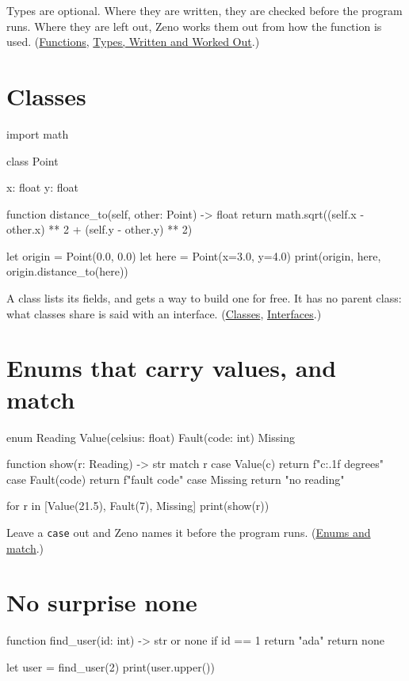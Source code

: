 Types are optional. Where they are written, they are checked before
the program runs. Where they are left out, Zeno works them out from
how the function is used. (\hyperref[ch-functions]{Functions},
\hyperref[ch-types]{Types, Written and Worked Out}.)

\section{Classes}

\begin{zeno}
import math

class Point {
    x: float
    y: float

    function distance_to(self, other: Point) -> float {
        return math.sqrt((self.x - other.x) ** 2 + (self.y - other.y) ** 2)
    }
}

let origin = Point(0.0, 0.0)
let here = Point(x=3.0, y=4.0)
print(origin, here, origin.distance_to(here))
\end{zeno}

A class lists its fields, and gets a way to build one for free. It has
no parent class: what classes share is said with an interface.
(\hyperref[ch-classes]{Classes}, \hyperref[ch-interfaces]{Interfaces}.)

\section{Enums that carry values, and match}

\begin{zeno}
enum Reading {
    Value(celsius: float)
    Fault(code: int)
    Missing
}

function show(r: Reading) -> str {
    match r {
        case Value(c) { return f"{c:.1f} degrees" }
        case Fault(code) { return f"fault {code}" }
        case Missing { return "no reading" }
    }
}

for r in [Value(21.5), Fault(7), Missing] {
    print(show(r))
}
\end{zeno}

Leave a \verb|case| out and Zeno names it before the program runs.
(\hyperref[ch-enums]{Enums and match}.)

\section{No surprise none}

\begin{zeno}[fails=yes]
function find_user(id: int) -> str or none {
    if id == 1 {
        return "ada"
    }
    return none
}

let user = find_user(2)
print(user.upper())
\end{zeno}

